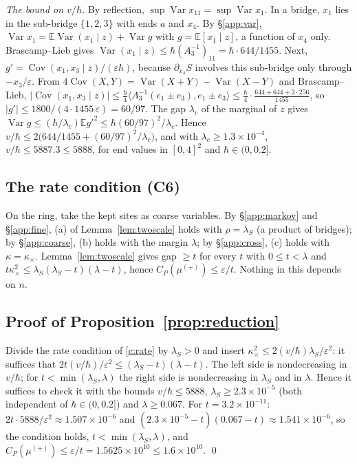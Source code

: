 \documentclass[11pt,a4paper]{article}
\theoremstyle{definition}
\theoremstyle{remark}
\newcommand{\E}{\mathbb{E}}
\DeclareMathOperator{\Cov}{Cov}
\DeclareMathOperator{\Var}{Var}
\begin{document}
\emph{The bound on $v/\hbar$.} By reflection, $\sup\Var x_{11}=\sup\Var x_1$. In a bridge, $x_1$ lies in the sub-bridge $\{1,2,3\}$ with ends $a$ and $x_4$. By \S\ref{app:var}, $\Var x_1=\E\Var(x_1\mid z)+\Var g$ with $g=\E[x_1\mid z]$, a function of $x_4$ only. Brascamp--Lieb gives $\Var(x_1\mid z)\le\hbar(A_3^{-1})_{11}=\hbar\cdot644/1455$. Next, $g'=\Cov(x_1,x_3\mid z)/(\varepsilon\hbar)$, because $\partial_{x_4}S$ involves this sub-bridge only through $-x_3/\varepsilon$. From $4\Cov(X,Y)=\Var(X+Y)-\Var(X-Y)$ and Brascamp--Lieb, $|\Cov(x_1,x_3\mid z)|\le\frac\hbar4\langle A_3^{-1}(e_1\pm e_3),e_1\pm e_3\rangle\le\frac\hbar4\cdot\frac{644+644+2\cdot256}{1455}$, so $|g'|\le1800/(4\cdot1455\,\varepsilon)=60/97$. The gap $\lambda_c$ of the marginal of $z$ gives $\Var g\le(\hbar/\lambda_c)\E g'^2\le\hbar(60/97)^2/\lambda_c$. Hence $v/\hbar\le2\bigl(644/1455+(60/97)^2/\lambda_c\bigr)$, and with $\lambda_c\ge1.3\times10^{-4}$, $v/\hbar\le5887.3\le5888$, for end values in $[0,4]^2$ and $\hbar\in(0,0.2]$.

\subsection{The rate condition (C6)}\label{app:rate}
On the ring, take the kept sites as coarse variables. By \S\ref{app:markov} and \S\ref{app:fine}, (a) of Lemma~\ref{lem:twoscale} holds with $\rho=\lambda_S$ (a product of bridges); by \S\ref{app:coarse}, (b) holds with the margin $\lambda$; by \S\ref{app:cross}, (c) holds with $\kappa=\kappa_\times$. Lemma~\ref{lem:twoscale} gives gap $\ge t$ for every $t$ with $0\le t<\lambda$ and $t\kappa_\times^2\le\lambda_S(\lambda_S-t)(\lambda-t)$, hence $C_P(\mu^{(+)})\le\varepsilon/t$. Nothing in this depends on $n$.

\subsection{Proof of Proposition~\ref{prop:reduction}}\label{app:prop}
Divide the rate condition of \ref{c:rate} by $\lambda_S>0$ and insert $\kappa_\times^2\le2(v/\hbar)\lambda_S/\varepsilon^2$: it suffices that $2t(v/\hbar)/\varepsilon^2\le(\lambda_S-t)(\lambda-t)$. The left side is nondecreasing in $v/\hbar$; for $t<\min(\lambda_S,\lambda)$ the right side is nondecreasing in $\lambda_S$ and in $\lambda$. Hence it suffices to check it with the bounds $v/\hbar\le5888$, $\lambda_S\ge2.3\times10^{-5}$ (both independent of $\hbar\in(0,0.2]$) and $\lambda\ge0.067$. For $t=3.2\times10^{-11}$: $2t\cdot5888/\varepsilon^2\approx1.507\times10^{-6}$ and $(2.3\times10^{-5}-t)(0.067-t)\approx1.541\times10^{-6}$, so the condition holds, $t<\min(\lambda_S,\lambda)$, and $C_P(\mu^{(+)})\le\varepsilon/t=1.5625\times10^{10}\le1.6\times10^{10}$. \qed
\end{document}
